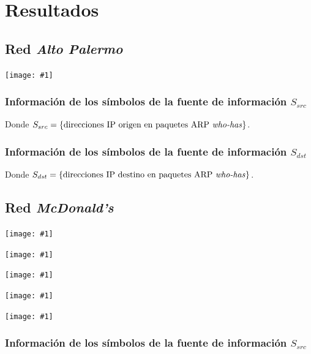 \documentclass[a4paper, 10pt, twoside]{article}
\newcommand{\grafo}[1]{
  \texttt{[image: \#1]}
}
\begin{document}
\section{Resultados}




\subsection{Red \emph{Alto Palermo}}

\grafo{altopalermo}


\subsubsection{Información de los símbolos de la fuente de información $S_{src}$}

Donde $S_{src} = \{ \text{direcciones IP origen en paquetes ARP \textit{who-has}} \}$.


\vspace{2cm}


\subsubsection{Información de los símbolos de la fuente de información $S_{dst}$}

Donde $S_{dst} = \{ \text{direcciones IP destino en paquetes ARP \textit{who-has}} \}$.


\vspace{2cm}




\subsection{Red \emph{McDonald's}}

\grafo{mcdonalds}

\grafo{mcdonalds-172.17.12.2}

\grafo{mcdonalds-172.17.12.1}

\grafo{mcdonalds-172.17.203.1}

\grafo{mcdonalds-0.0.0.0}


\subsubsection{Información de los símbolos de la fuente de información $S_{src}$}
\end{document}
